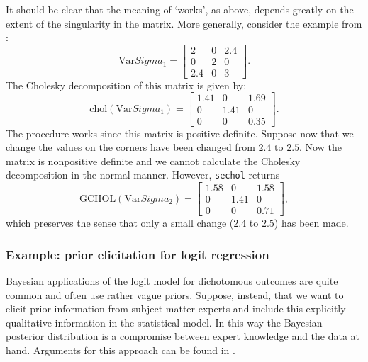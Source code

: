 \documentclass[11pt]{article}
\let\code=\texttt
\begin{document}
It should be clear that the meaning of `works', as above, depends greatly on the extent of the singularity in
the matrix. More generally, consider the example from \citet{AltGilMcD03}:
\begin{equation}\label{sechol1.example}
  	\text{Var}Sigma_1=\left[\begin{matrix} 2 & 0 & 2.4\\ 0 & 2 & 0\\ 2.4 & 0 & 3 \end{matrix}\right].
\end{equation}
The Cholesky decomposition of this matrix is given by:
\begin{equation}
        \text{chol}(\text{Var}Sigma_1) = \left[ \begin{matrix} 1.41 & 0 & 1.69\\ 0
	& 1.41 & 0\\ 0 & 0 & 0.35 \end{matrix} \right].
\end{equation}
The procedure works since this matrix is positive definite. Suppose now that we change the values on 
the corners have been changed from $2.4$ to $2.5$. Now the matrix is nonpositive definite and we
cannot calculate the Cholesky decomposition in the normal manner. However, \code{sechol} returns
\begin{equation}
  	\text{GCHOL}(\text{Var}Sigma_2)=\left[ \begin{matrix} 1.58 & 0 & 1.58\\ 0
        & 1.41 & 0\\ 0 & 0 & 0.71 \end{matrix} \right],
\end{equation}
which preserves the sense that only a small change ($2.4$ to $2.5$) has been made.

\subsubsection{Example: prior elicitation for logit regression}

Bayesian applications of the logit model for dichotomous outcomes are quite common and often 
use rather vague priors. Suppose, instead, that we want to elicit prior information from 
subject matter experts and include this explicitly qualitative information in the statistical 
model. In this way the Bayesian posterior 
distribution is a compromise between expert knowledge and the data at hand. Arguments for 
this approach can be found in \citet{GilWal05}.
\end{document}
